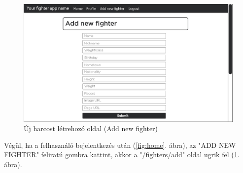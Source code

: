 \begin{figure}[htb]
\centering
\includegraphics[scale=0.7]{kepek/add_new_fighter.jpg}
\caption{Új harcost létrehozó oldal (Add new fighter)}
\label{fig:add}
\end{figure}
\newpage
Végül, ha a felhasználó bejelentkezés után (\ref{fig:home}. ábra), az "ADD NEW FIGHTER" feliratú gombra kattint, akkor a "/fighters/add" oldal ugrik fel (\ref{fig:add}. ábra).
